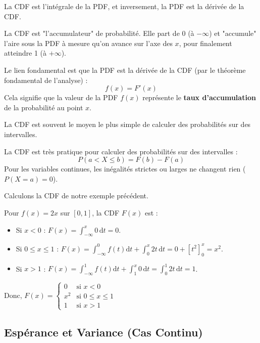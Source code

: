 La CDF est l'intégrale de la PDF, et inversement, la PDF est la dérivée de la CDF.

\begin{intuitionbox}
La CDF est "l'accumulateur" de probabilité. Elle part de 0 (à $-\infty$) et "accumule" l'aire sous la PDF à mesure qu'on avance sur l'axe des $x$, pour finalement atteindre 1 (à $+\infty$).

Le lien fondamental est que la PDF est la dérivée de la CDF (par le théorème fondamental de l'analyse) :
$$ f(x) = F'(x) $$
Cela signifie que la valeur de la PDF $f(x)$ représente le \textbf{taux d'accumulation} de la probabilité au point $x$.
\end{intuitionbox}

La CDF est souvent le moyen le plus simple de calculer des probabilités sur des intervalles.

\begin{remarquebox}
La CDF est très pratique pour calculer des probabilités sur des intervalles :
$$ P(a < X \le b) = F(b) - F(a) $$
Pour les variables continues, les inégalités strictes ou larges ne changent rien ($P(X=a)=0$).
\end{remarquebox}

Calculons la CDF de notre exemple précédent.

\begin{examplebox}
Pour $f(x) = 2x$ sur $[0, 1]$, la CDF $F(x)$ est :
\begin{itemize}
    \item Si $x < 0$ : $F(x) = \int_{-\infty}^x 0 \, \mathrm{d}t = 0$.
    \item Si $0 \le x \le 1$ : $F(x) = \int_{-\infty}^0 f(t) \mathrm{d}t + \int_0^x 2t \, \mathrm{d}t = 0 + [t^2]_0^x = x^2$.
    \item Si $x > 1$ : $F(x) = \int_{-\infty}^1 f(t) \mathrm{d}t + \int_1^x 0 \, \mathrm{d}t = \int_0^1 2t \, \mathrm{d}t = 1$.
\end{itemize}
Donc, $F(x) = \begin{cases} 0 & \text{si } x < 0 \\ x^2 & \text{si } 0 \le x \le 1 \\ 1 & \text{si } x > 1 \end{cases}$
\end{examplebox}

\subsection{Espérance et Variance (Cas Continu)}

